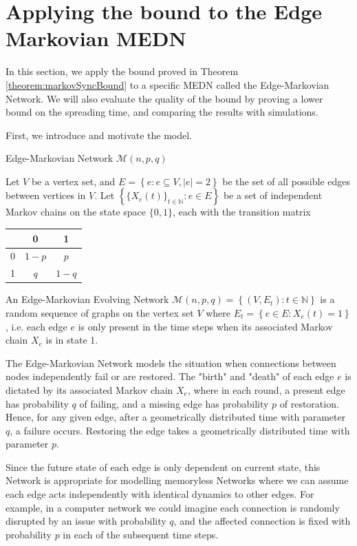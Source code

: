 \section{Applying the bound to the Edge Markovian MEDN}\label{section:floodingBoundEdgeMarkovian}

In this section, we apply the bound proved in Theorem \ref{theorem:markovSyncBound} to a specific MEDN called the Edge-Markovian Network. We will also evaluate the quality of the bound by proving a lower bound on the spreading time, and comparing the results with simulations. 

First, we introduce and motivate the model.
\begin{definition}
	Edge-Markovian Network $\mathcal{M}(n, p, q)$

	\noindent
	Let $V$ be a vertex set, and $E = \left\{e : e \subseteq V, |e| = 2 \right\}$ be the set of all possible edges between vertices in $V$. 
	Let $\left\{\{X_e(t)\}_{t \in \mathbb{N}} : e \in E \right\}$ be a set of independent Markov chains on the state space $\{0,1\}$, each with the transition matrix
	\begin{center}
		\begin{tabular}{ c | c c }
		   & 0     & 1 \\ 
		\hline
		 0 & $1 - p$ & $p$ \\  
		 1 & $q$     & $1 - q$  
		\end{tabular}
	\end{center}
	An Edge-Markovian Evolving Network $\mathcal{M}(n, p, q) = \left\{(V, E_t) : t \in \mathbb{N} \right\}$ is a random sequence of graphs on the vertex set $V$ where $E_t = \left\{ e \in E : X_e(t) = 1 \right\}$, i.e. each edge $e$ is only present in the time steps when its associated Markov chain $X_e$ is in state 1.
\end{definition}
The Edge-Markovian Network models the situation when connections between nodes independently fail or are restored. The "birth" and "death" of each edge $e$ is dictated by its associated Markov chain $X_e$, where in each round, a present edge has probability $q$ of failing, and a missing edge has probability $p$ of restoration. Hence, for any given edge, after a geometrically distributed time with parameter $q$, a failure occurs. Restoring the edge takes a geometrically distributed time with parameter $p$.

Since the future state of each edge is only dependent on current state, this Network is appropriate for modelling memoryless Networks where we can assume each edge acts independently with identical dynamics to other edges. For example, in a computer network we could imagine each  connection is randomly disrupted by an issue with probability $q$, and the affected connection is fixed with probability $p$ in each of the subsequent time steps. 

